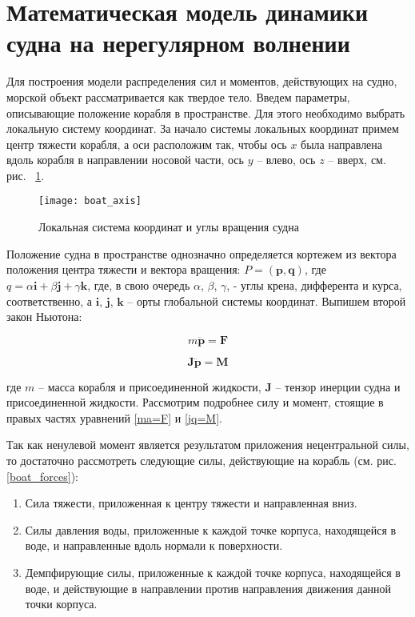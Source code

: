 \section{Математическая модель динамики судна на нерегулярном волнении}
\label{math_ship}

Для построения модели распределения сил и моментов, действующих на судно, морской объект рассматривается как твердое тело. Введем параметры, описывающие положение корабля в пространстве. Для этого необходимо выбрать локальную систему координат. За начало системы локальных координат примем центр тяжести корабля, а оси расположим так, чтобы ось $x$ была направлена вдоль корабля в направлении носовой части, ось $y$ – влево, ось $z$ – вверх, см. рис. ~\ref{boat_axis}.

\begin{figure}[ht]
\begin{center}
\texttt{[image: boat\_axis]}
\end{center}
\caption{Локальная система координат и углы вращения судна}
\label{boat_axis}
\end{figure}

Положение судна в пространстве однозначно определяется кортежем из вектора положения центра тяжести и вектора вращения: 
$P=(\mathbf{p},\mathbf{q})$, 
где  
$q=\alpha \mathbf{i}+\beta \mathbf{j}+\gamma \mathbf{k}$, 
где, в свою очередь $\alpha$, $\beta$, $\gamma$,  - углы крена, дифферента и курса, соответственно, а $\mathbf{i}$, $\mathbf{j}$, $\mathbf{k}$ – орты глобальной системы координат. Выпишем второй закон Ньютона:

\begin{equation}
	m \ddot{\mathbf{p}} = \mathbf{F}
	\label{ma=F}
\end{equation}

\begin{equation}
	\mathbf{J}  \ddot{\mathbf{p}} = \mathbf{M}
	\label{jq=M}
\end{equation}

где $m$ – масса корабля и присоединенной жидкости, $\mathbf{J}$ – тензор инерции судна и присоединенной жидкости. Рассмотрим подробнее силу и момент, стоящие в правых частях уравнений \eqref{ma=F} и \eqref{jq=M}. 

Так как ненулевой момент является результатом приложения нецентральной силы, то достаточно рассмотреть следующие силы, действующие на корабль (см. рис. \ref{boat_forces}):
\begin{enumerate}
\item	Сила тяжести, приложенная к центру тяжести и направленная вниз.
\item	Силы давления воды, приложенные к каждой точке корпуса, находящейся в воде, и направленные вдоль нормали к поверхности.
\item	Демпфирующие силы, приложенные к каждой точке корпуса, находящейся в воде, и действующие в направлении против направления движения  данной точки корпуса.
\end{enumerate}

